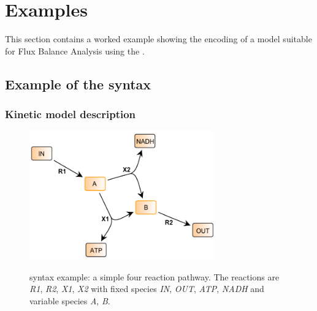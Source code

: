 
\section{Examples}
\label{examples}

This section contains a worked example showing the encoding of a model suitable for Flux Balance Analysis using the \FBCPackage.

\subsection{Example of the \FBC syntax}

\subsubsection{Kinetic model description}
\begin{figure}[h]
  \centering
  \includegraphics[width=8cm]{examples/spec-example1.pdf}\\
  \caption{\FBC syntax example: a simple four reaction pathway. The
  reactions are \textit{R1}, \textit{R2}, \textit{X1}, \textit{X2} with
  fixed species \textit{IN}, \textit{OUT}, \textit{ATP}, \textit{NADH} and
  variable species \textit{A}, \textit{B}.}
  \label{fig:example1}
\end{figure}

